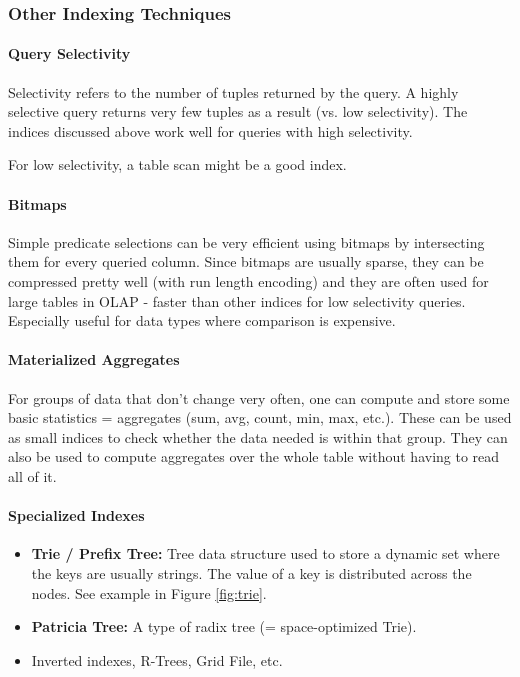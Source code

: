 \subsubsection{Other Indexing Techniques}

\paragraph{Query Selectivity}
Selectivity refers to the number of tuples returned by the query. A highly selective query returns very few tuples as a result (vs. low selectivity). The indices discussed above work well for queries with high selectivity.

For low selectivity, a table scan might be a good index. %

\paragraph{Bitmaps}
Simple predicate selections can be very efficient using bitmaps by intersecting them for every queried column. Since bitmaps are usually sparse, they can be compressed pretty well (with run length encoding) and they are often used for large tables in OLAP - faster than other indices for low selectivity queries. Especially useful for data types where comparison is expensive. %

\paragraph{Materialized Aggregates}
For groups of data that don't change very often, one can compute and store some basic statistics = aggregates (sum, avg, count, min, max, etc.). These can be used as small indices to check whether the data needed is within that group. They can also be used to compute aggregates over the whole table without having to read all of it.

\paragraph{Specialized Indexes}
\begin{itemize}
    \item \textbf{Trie / Prefix Tree:} Tree data structure used to store a dynamic set where the keys are usually strings. The value of a key is distributed across the nodes. See example in Figure \ref{fig:trie}.
    \item \textbf{Patricia Tree:} A type of radix tree (= space-optimized Trie).
    \item Inverted indexes, R-Trees, Grid File, etc.
\end{itemize}


